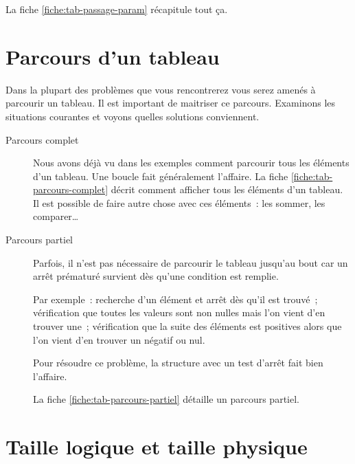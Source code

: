 			La fiche \vref{fiche:tab-passage-param} récapitule tout ça.

	\section{Parcours d’un tableau} 
	\label{Les parcours de tableaux}

		Dans la plupart des problèmes que vous rencontrerez vous serez amenés
		à parcourir un tableau.  Il est important de maitriser ce parcours.
		Examinons les situations courantes et voyons quelles solutions
		conviennent.
	
		\begin{description}

			\item[Parcours complet]
		
			Nous avons déjà vu dans les exemples comment parcourir tous les
			éléments d’un tableau.  Une boucle  fait généralement
			l'affaire.  La fiche \vref{fiche:tab-parcours-complet} décrit
			comment afficher tous les éléments d’un tableau.  Il est possible de
			faire autre chose avec ces éléments~: les sommer, les comparer\dots

			\item[Parcours partiel]
		
			Parfois, il n'est pas nécessaire de parcourir le tableau jusqu’au
			bout car un arrêt prématuré survient dès qu'une condition est
			remplie. 
			
			Par exemple~: recherche d'un élément et arrêt dès qu'il est trouvé~;
			vérification que toutes les valeurs sont non nulles mais l'on vient
			d'en trouver une~; vérification que la suite des éléments est
			positives alors que l'on vient d'en trouver un négatif ou nul.
	
			Pour résoudre ce problème, la structure  avec un test
			d'arrêt fait bien l'affaire. 
			
			La fiche \vref{fiche:tab-parcours-partiel} détaille un parcours
			partiel.
	
		\end{description}
	
	\section{Taille logique et 
	taille physique} 

